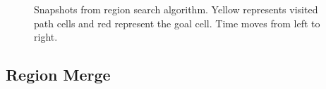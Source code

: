 \begin{figure}[!h]
\centering
            \hfill
            \hfill
            \hfill
            \hfill
            \caption{Snapshots from region search algorithm. Yellow represents visited path cells and red represent the goal cell. Time moves from left to right.}
\label{fig:region-search}
\end{figure}

\subsection{Region Merge}


